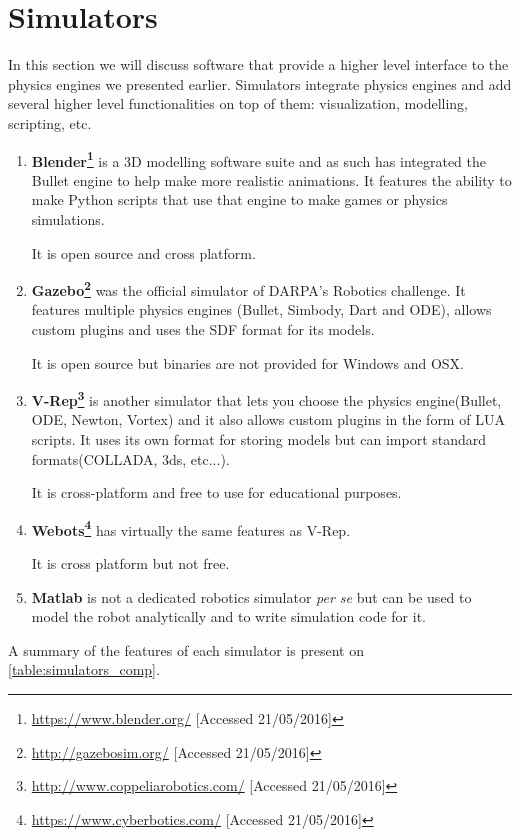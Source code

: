 \section{Simulators}
In this section we will discuss software that provide a higher level interface to the physics engines we presented earlier. Simulators integrate physics engines and add several higher level functionalities on top of them: visualization, modelling, scripting, etc. 
\begin{enumerate}

\item \textbf{Blender\footnote{\url{https://www.blender.org/} [Accessed 21/05/2016]}} is a 3D modelling software suite and as such has integrated the Bullet engine to help make more realistic animations. It features the ability to make Python scripts that use that engine to make games or physics simulations. 

It is open source and cross platform.

\item \textbf{Gazebo\footnote{\url{http://gazebosim.org/} [Accessed 21/05/2016]}} was the official simulator of DARPA's Robotics challenge. It features multiple physics engines (Bullet, Simbody, Dart and ODE), allows custom plugins and uses the SDF format for its models. 

It is open source but binaries are not provided for Windows and OSX.

\item \textbf{V-Rep\footnote{\url{http://www.coppeliarobotics.com/} [Accessed 21/05/2016]}} is another simulator that lets you choose the physics engine(Bullet, ODE, Newton, Vortex) and it also allows custom plugins in the form of LUA scripts. It uses its own format for storing models but can import standard formats(COLLADA, 3ds, etc...).

It is cross-platform and free to use for educational purposes.

\item \textbf{Webots\footnote{\url{https://www.cyberbotics.com/} [Accessed 21/05/2016]}} has virtually the same features as V-Rep.

It is cross platform but not free.

\item \textbf{Matlab} is not a dedicated robotics simulator \textit{per se} but can be used to model the robot analytically and to write simulation code for it. 
\end{enumerate}

A summary of the features of each simulator is present on \cref{table:simulators_comp}.

